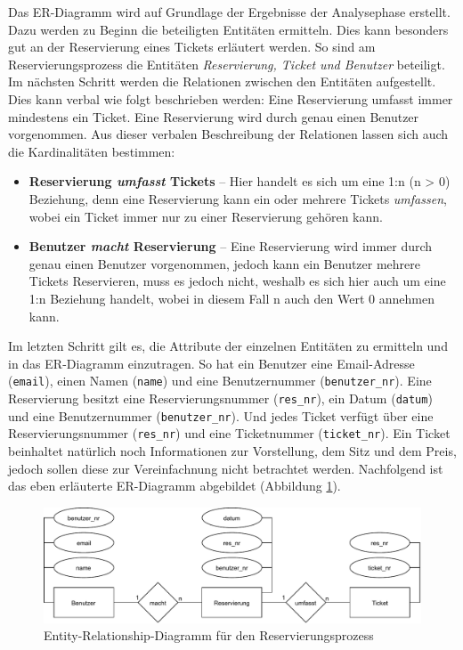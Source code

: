 		Das ER-Diagramm wird auf Grundlage der Ergebnisse der Analysephase erstellt. Dazu werden zu Beginn die beteiligten Entitäten ermitteln. Dies kann besonders gut an der Reservierung eines Tickets erläutert werden. So sind am Reservierungsprozess die Entitäten \textit{Reservierung, Ticket und Benutzer} beteiligt. Im nächsten Schritt werden die Relationen zwischen den Entitäten aufgestellt. Dies kann verbal wie folgt beschrieben werden: Eine Reservierung umfasst immer mindestens ein Ticket. Eine Reservierung wird durch genau einen Benutzer vorgenommen. Aus dieser verbalen Beschreibung der Relationen lassen sich auch die Kardinalitäten bestimmen:
		\begin{itemize}
			\item \textbf{Reservierung \textit{umfasst} Tickets} -- Hier handelt es sich um eine 1:n (n > 0) Beziehung, denn eine Reservierung kann ein oder mehrere Tickets \textit{umfassen}, wobei ein Ticket immer nur zu einer Reservierung gehören kann.
			
			\item  \textbf{Benutzer \textit{macht} Reservierung} -- Eine Reservierung wird immer durch genau einen Benutzer vorgenommen, jedoch kann ein Benutzer mehrere Tickets Reservieren, muss es jedoch nicht, weshalb es sich hier auch um eine 1:n Beziehung handelt, wobei in diesem Fall n auch den Wert 0 annehmen kann. 
		\end{itemize}
		Im letzten Schritt gilt es, die Attribute der einzelnen Entitäten zu ermitteln und in das ER-Diagramm einzutragen. So hat ein Benutzer eine Email-Adresse (\texttt{email}), einen Namen (\texttt{name}) und eine Benutzernummer (\texttt{benutzer\_nr}). Eine Reservierung besitzt eine Reservierungsnummer (\texttt{res\_nr}), ein Datum (\texttt{datum}) und eine Benutzernummer (\texttt{benutzer\_nr}). Und jedes Ticket verfügt über eine Reservierungsnummer (\texttt{res\_nr}) und eine Ticketnummer (\texttt{ticket\_nr}). Ein Ticket beinhaltet natürlich noch Informationen zur Vorstellung, dem Sitz und dem Preis, jedoch sollen diese zur Vereinfachnung nicht betrachtet werden. Nachfolgend ist das eben erläuterte ER-Diagramm abgebildet (Abbildung \ref{fig:erdiagramm_reservation}).
		
		\begin{figure}[H]
			\centering 
			\includegraphics[width=13cm]{img/erdiagramm_reservation.pdf}
			\captionsetup{format=hang}
			\caption[ER-Datenmodell Reservierungsprozess]{\label{fig:erdiagramm_reservation} Entity-Relationship-Diagramm für den Reservierungsprozess}
		\end{figure}
		
